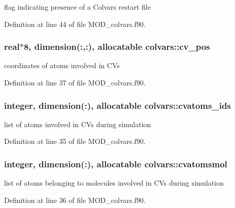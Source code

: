 flag indicating presence of a Colvars restart file 



Definition at line 44 of file M\-O\-D\-\_\-colvars.\-f90.

\hypertarget{classcolvars_a5c87abb4eb394e48d2cbd47413dc8179}{
\subsubsection[{cv\-\_\-pos}]{\setlength{\rightskip}{0pt plus 5cm}real$\ast$8, dimension(\-:,\-:), allocatable colvars\-::cv\-\_\-pos}}\label{classcolvars_a5c87abb4eb394e48d2cbd47413dc8179}


coordinates of atoms involved in C\-Vs 



Definition at line 37 of file M\-O\-D\-\_\-colvars.\-f90.

\hypertarget{classcolvars_a0ced678acae8973d2d446efd19dbbd9f}{
\subsubsection[{cvatoms\-\_\-ids}]{\setlength{\rightskip}{0pt plus 5cm}integer, dimension(\-:), allocatable colvars\-::cvatoms\-\_\-ids}}\label{classcolvars_a0ced678acae8973d2d446efd19dbbd9f}


list of atoms involved in C\-Vs during simulation 



Definition at line 35 of file M\-O\-D\-\_\-colvars.\-f90.

\hypertarget{classcolvars_a47f5647f261368e31a172ea3f2f629af}{
\subsubsection[{cvatomsmol}]{\setlength{\rightskip}{0pt plus 5cm}integer, dimension(\-:), allocatable colvars\-::cvatomsmol}}\label{classcolvars_a47f5647f261368e31a172ea3f2f629af}


list of atoms belonging to molecules involved in C\-Vs during simulation 



Definition at line 36 of file M\-O\-D\-\_\-colvars.\-f90.

